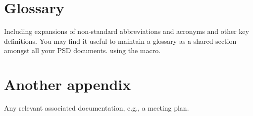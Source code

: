 \documentclass{l3deliverable}
\begin{document}
\section{Glossary}

Including expansions of non-standard abbreviations and acronyms and
other key definitions.  You may find it useful to maintain a glossary
as a shared section amongst all your PSD documents. using the
\verb!! macro.

\section{Another appendix}

Any relevant associated documentation, e.g., a meeting plan.
\end{document}
